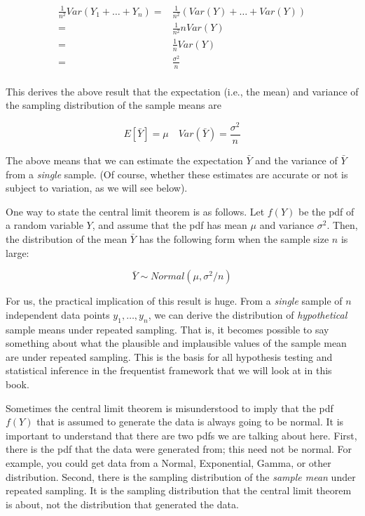 \documentclass[
  12pt,
]{krantz}
\theoremstyle{definition}
\theoremstyle{definition}
\theoremstyle{definition}
\theoremstyle{definition}
\theoremstyle{remark}
\begin{document}
\begin{blackbox}
\begin{equation} \label{sdsmderivation}
\begin{split}
\frac{1}{n^2} Var(Y_1 + \dots + Y_n) =& \frac{1}{n^2} (Var(Y) + \dots + Var(Y))\\
=&  \frac{1}{n^2}  n Var(Y)\\
=&  \frac{1}{n}  Var(Y)\\
=&  \frac{\sigma^2}{n}\\
\end{split}
\end{equation}

This derives the above result that the expectation (i.e., the mean) and variance of the sampling distribution of the sample means are

\begin{equation}
E[\bar{Y}] = \mu \quad Var(\bar{Y}) = \frac{\sigma^2}{n}
\end{equation}

\end{blackbox}

The above means that we can estimate the expectation \(\bar{Y}\) and the variance of \(\bar{Y}\) from a \emph{single} sample. (Of course, whether these estimates are accurate or not is subject to variation, as we will see below).

One way to state the central limit theorem is as follows.
Let \(f(Y)\) be the pdf of a random variable \(Y\), and assume that the pdf has mean \(\mu\) and variance \(\sigma^2\). Then, the distribution of the mean \(\bar{Y}\) has the following form when the sample size \(n\) is large:

\begin{equation}
\bar{Y} \sim Normal(\mu,\sigma^2/n)  
\end{equation}

For us, the practical implication of this result is huge. From a \emph{single} sample of \(n\) independent data points \(y_1,\dots, y_n\), we can derive the distribution of \emph{hypothetical} sample means under repeated sampling. That is, it becomes possible to say something about what the plausible and implausible values of the sample mean are under repeated sampling. This is the basis for all hypothesis testing and statistical inference in the frequentist framework that we will look at in this book.

Sometimes the central limit theorem is misunderstood to imply that the pdf \(f(Y)\) that is assumed to generate the data is always going to be normal. It is important to understand that there are two pdfs we are talking about here. First, there is the pdf that the data were generated from; this need not be normal. For example, you could get data from a Normal, Exponential, Gamma, or other distribution. Second, there is the sampling distribution of the \emph{sample mean} under repeated sampling. It is the sampling distribution that the central limit theorem is about, not the distribution that generated the data.
\end{document}
